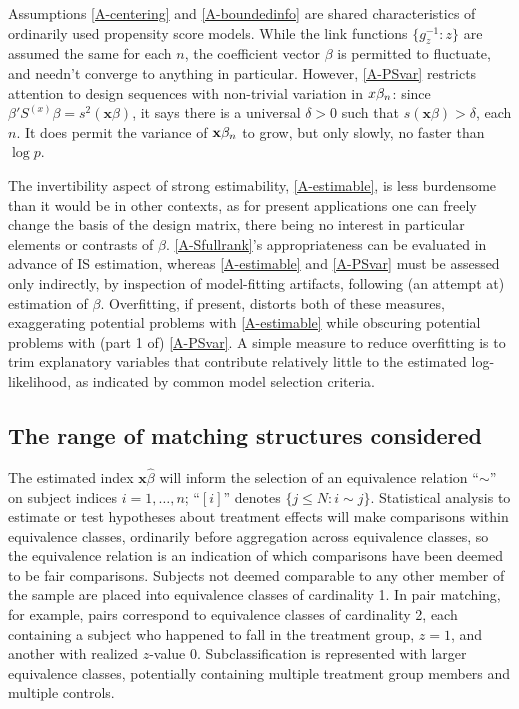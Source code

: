\documentclass{article}
\theoremstyle{remark}
\begin{document}
Assumptions \ref{A-centering} and \ref{A-boundedinfo} are shared characteristics of ordinarily used propensity score models.  While the link functions $\{g_{z}^{-1}: z\}$ are assumed the same for each $n$, the coefficient vector $\beta$ is permitted to fluctuate, and needn't converge to anything in particular.  However, \ref{A-PSvar} restricts attention to design sequences with non-trivial variation in ${x}\beta_{n } $: since $\beta'S^{(x)}\beta = s^{2}(\mathbf{x}\beta)$, it says there is a universal $\delta>0$ such that $s(\mathbf{x}\beta)>\delta$, each $n$.   It does permit the variance of $\mathbf{x}\beta_{n }$ to grow, but only slowly, no faster than $\log p$. 

The invertibility aspect of strong estimability, \ref{A-estimable}, is less burdensome than it would be in other contexts, as for present applications one can freely change the basis of the design matrix, there being no interest in particular elements or contrasts of $\beta$.   
\ref{A-Sfullrank}'s appropriateness can be evaluated in advance of IS estimation, whereas \ref{A-estimable} and \ref{A-PSvar} must be assessed only indirectly, by inspection of model-fitting artifacts, following (an attempt at) estimation of $\beta$.
Overfitting, if present, distorts both of these measures, exaggerating potential problems with \ref{A-estimable} while obscuring potential problems with (part 1 of) \ref{A-PSvar}.  A simple measure to reduce overfitting is to trim explanatory variables that contribute relatively little to the estimated log-likelihood, as indicated by common model selection criteria.

\subsection{The range of matching structures considered}

The estimated index $\mathbf{x}\hat\beta$ will inform the selection of an equivalence relation ``$\sim$'' on subject indices $i = 1, \ldots, n$; ``$[i]$'' denotes $\{j\leq N: i \sim j\}$. Statistical analysis to estimate or test hypotheses about treatment effects will make comparisons within equivalence classes, ordinarily before aggregation across equivalence classes, so the equivalence relation is an indication of which comparisons have been deemed to be fair comparisons.  Subjects not deemed comparable to any other member of the sample are placed into equivalence classes of cardinality 1.  In pair matching, for example, pairs correspond to equivalence classes of cardinality 2, each containing a subject who happened to fall in the treatment group, $z=1$, and another with realized  $z$-value 0. Subclassification is represented with larger equivalence classes, potentially containing multiple treatment group members and multiple controls. 
\end{document}
